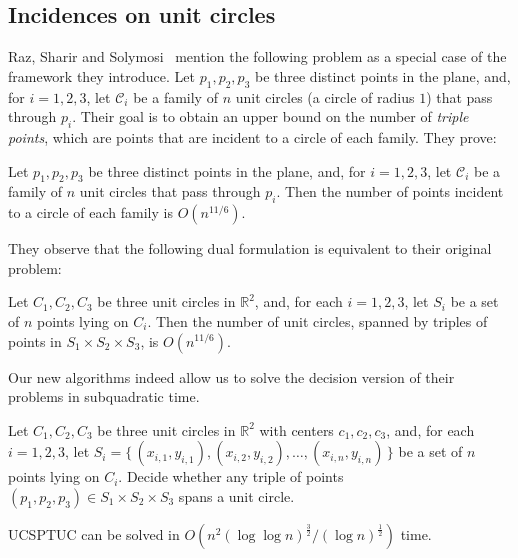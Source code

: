 \subsection{Incidences on unit circles}

Raz, Sharir and Solymosi~\cite{RSS15} mention the following problem as a
special case of the framework they introduce.
Let $p_1,p_2,p_3$ be three distinct points in the plane, and, for $i=1,2,3$,
let $\mathcal{C}_i$ be a family of $n$ unit circles (a circle of radius $1$)
that pass through $p_i$.  Their goal is to obtain an upper bound on the number
of \emph{triple points}, which are points that are incident to a circle of each
family.
%
They prove:
\begin{theorem}
	Let $p_1,p_2,p_3$ be three distinct points in the plane, and, for $i=1,2,3$,
	let $\mathcal{C}_i$ be a family of $n$ unit circles that pass through $p_i$.
	Then the number of points incident to a circle of each family is $O(n^{11/6})$.
\end{theorem}

They observe that the following dual formulation is equivalent to their
original problem:
\begin{theorem}
	Let $C_1,C_2,C_3$ be three unit circles in $\mathbb{R}^2$, and, for each
	$i=1,2,3$, let $S_i$ be a set of $n$ points lying on $C_i$. Then the number of
	unit circles, spanned by triples of points in $S_1 \times S_2 \times S_3$, is
	$O(n^{11/6})$.
\end{theorem}

Our new algorithms indeed allow us to solve the decision version of their
problems in subquadratic time.
\begin{problem}
	Let $C_1,C_2,C_3$ be three unit circles in $\mathbb{R}^2$ with centers
	$c_1,c_2,c_3$, and, for each $i=1,2,3$, let $S_i =
	\{\,(x_{i,1},y_{i,1}),(x_{i,2},y_{i,2}),\ldots,(x_{i,n},y_{i,n})\,\}$ be a
	set of $n$ points lying on $C_i$. Decide whether any triple of points
	$(p_1,p_2,p_3) \in S_1 \times S_2 \times S_3$ spans a unit circle.
\end{problem}

\begin{theorem}
	UCSPTUC can be solved in
	$O(n^2 {(\log \log n)}^\frac{3}{2} / {(\log n)}^\frac{1}{2})$ time.
\end{theorem}

